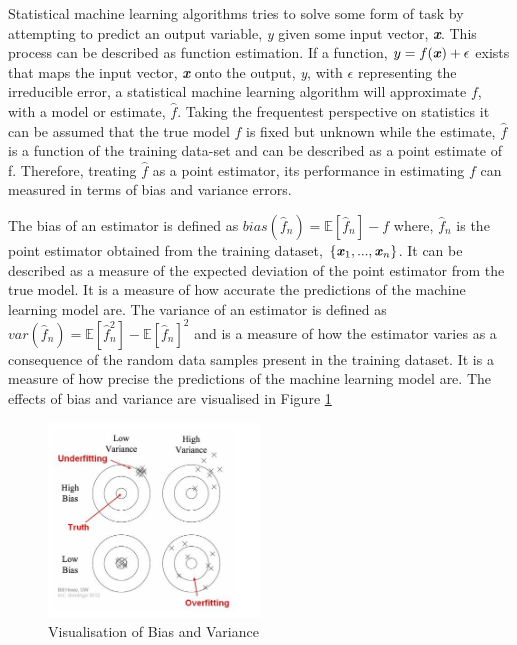 \documentclass[../SMLreport_template.tex]{subfiles}
\begin{document}
Statistical machine learning algorithms tries to solve some form of task by attempting to predict an output variable, \textit{y} given some input vector, \textbf{\textit{x}}. This process can be described as function estimation. If a function, \(y = f(\textbf{\textit{x}}) + \epsilon\) exists that maps the input vector, \textbf{\textit{x}} onto the output, \textit{y}, with \(\epsilon\) representing the irreducible error, a statistical machine learning algorithm will approximate \(f\), with a model or estimate, \(\hat{f}\). Taking the frequentest perspective on statistics it can be assumed that the true model \(f\) is fixed but unknown while the estimate, \(\hat{f}\) is a function of the training data-set and can be described as a point estimate of f. Therefore, treating \(\hat{f}\) as a point estimator, its performance in estimating \(f\) can measured in terms of bias and variance errors. \par
\noindent 

The bias of an estimator is defined as \(bias(\hat{f}_n) = \mathbb{E}[\hat{f}_n] - f  \) where, \(\hat{f}_n\) is the point estimator obtained from the training dataset, \(\{\textbf{\textit{x}}_1, ... , \textbf{\textit{x}}_n\}\). It can be described as a measure of the expected deviation of the point estimator from the true model. It is a measure of how accurate the predictions of the machine learning model are. The variance of an estimator is defined as \(var(\hat{f}_n) = \mathbb{E}[\hat{f}_n^2] - \mathbb{E}[\hat{f}_n]^2 \) and is a measure of how the estimator varies as a consequence of the random data samples present in the training dataset. It is a measure of how precise the predictions of the machine learning model are. The effects of bias and variance are visualised in Figure \ref{acc} \par \noindent

\begin{figure}[t]
    \centering
    \includegraphics[width=0.5\textwidth]{images/accuracy.png}
    \caption{Visualisation of Bias and Variance}
    \label{acc}
\end{figure}
\end{document}
